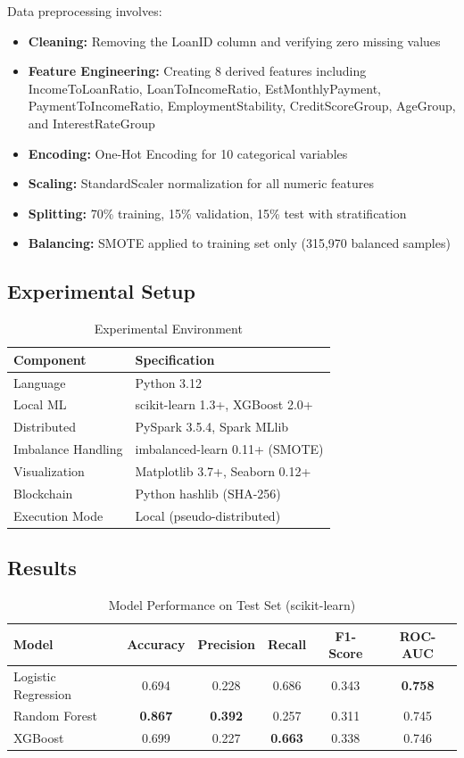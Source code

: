 \documentclass[preprint,12pt,authoryear]{elsarticle}
\begin{document}
Data preprocessing involves:
\begin{itemize}
    \item \textbf{Cleaning:} Removing the LoanID column and verifying zero missing values
    \item \textbf{Feature Engineering:} Creating 8 derived features including IncomeToLoanRatio, LoanToIncomeRatio, EstMonthlyPayment, PaymentToIncomeRatio, EmploymentStability, CreditScoreGroup, AgeGroup, and InterestRateGroup
    \item \textbf{Encoding:} One-Hot Encoding for 10 categorical variables
    \item \textbf{Scaling:} StandardScaler normalization for all numeric features
    \item \textbf{Splitting:} 70\% training, 15\% validation, 15\% test with stratification
    \item \textbf{Balancing:} SMOTE applied to training set only (315,970 balanced samples)
\end{itemize}

\subsection{Experimental Setup}

\begin{table}[htbp]
\centering
\caption{Experimental Environment}
\label{tab:setup}
\begin{tabular}{@{}ll@{}}
\toprule
Component & Specification \\
\midrule
Language & Python 3.12 \\
Local ML & scikit-learn 1.3+, XGBoost 2.0+ \\
Distributed & PySpark 3.5.4, Spark MLlib \\
Imbalance Handling & imbalanced-learn 0.11+ (SMOTE) \\
Visualization & Matplotlib 3.7+, Seaborn 0.12+ \\
Blockchain & Python hashlib (SHA-256) \\
Execution Mode & Local (pseudo-distributed) \\
\bottomrule
\end{tabular}
\end{table}

\subsection{Results}

\begin{table}[htbp]
\centering
\caption{Model Performance on Test Set (scikit-learn)}
\label{tab:local_results}
\begin{tabular}{@{}lccccc@{}}
\toprule
Model & Accuracy & Precision & Recall & F1-Score & ROC-AUC \\
\midrule
Logistic Regression & 0.694 & 0.228 & 0.686 & 0.343 & \textbf{0.758} \\
Random Forest & \textbf{0.867} & \textbf{0.392} & 0.257 & 0.311 & 0.745 \\
XGBoost & 0.699 & 0.227 & \textbf{0.663} & 0.338 & 0.746 \\
\bottomrule
\end{tabular}
\end{table}
\end{document}
